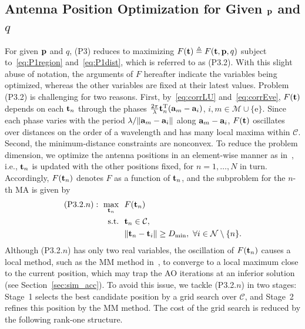 \documentclass[journal]{IEEEtran}
\begin{document}
\subsection{Antenna Position Optimization for Given $\mathbf{p}$ and $q$}\label{sec:position}

For given $\mathbf{p}$ and $q$, (P3) reduces to maximizing $F(\mathbf{t})\triangleq F(\mathbf{t},\mathbf{p},q)$ subject to~\eqref{eq:P1region} and~\eqref{eq:P1dist}, which is referred to as (P3.2). With this slight abuse of notation, the arguments of $F$ hereafter indicate the variables being optimized, whereas the other variables are fixed at their latest values. Problem (P3.2) is challenging for two reasons. First, by~\eqref{eq:corrLU} and~\eqref{eq:corrEve}, $F(\mathbf{t})$ depends on each $\mathbf{t}_n$ through the phases $\frac{2\pi}{\lambda}\mathbf{t}_n^{\mathrm T}(\mathbf{a}_{m}-\mathbf{a}_i)$, $i,m\in\mathcal M\cup\{\mathrm e\}$. Since each phase varies with the period $\lambda/\|\mathbf{a}_{m}-\mathbf{a}_i\|$ along $\mathbf{a}_{m}-\mathbf{a}_i$, $F(\mathbf{t})$ oscillates over distances on the order of a wavelength and has many local maxima within $\mathcal C$. Second, the minimum-distance constraints are nonconvex. To reduce the problem dimension, we optimize the antenna positions in an element-wise manner as in~\cite{ZhengTCOM2025}, i.e., $\mathbf{t}_n$ is updated with the other positions fixed, for $n=1,\ldots,N$ in turn. Accordingly, $F(\mathbf{t}_n)$ denotes $F$ as a function of $\mathbf{t}_n$, and the subproblem for the $n$-th MA is given by
\begin{subequations}\label{eq:P32n0}
\begin{align}
(\mathrm{P3.2}.n):\ \max_{\mathbf{t}_n}\ \ & F(\mathbf{t}_n)\\
\mathrm{s.t.}\ \ & \mathbf{t}_n\in\mathcal C,\\
& \|\mathbf{t}_n-\mathbf{t}_i\|\ge D_{\min},\ \forall i\in\mathcal N\setminus\{n\}.
\end{align}
\end{subequations}
Although (P3.2.$n$) has only two real variables, the oscillation of $F(\mathbf{t}_n)$ causes a local method, such as the MM method in~\cite{ZhengTCOM2025}, to converge to a local maximum close to the current position, which may trap the AO iterations at an inferior solution (see Section~\ref{sec:sim_acc}). To avoid this issue, we tackle (P3.2.$n$) in two stages: Stage~1 selects the best candidate position by a grid search over $\mathcal C$, and Stage~2 refines this position by the MM method. The cost of the grid search is reduced by the following rank-one structure.
\end{document}
